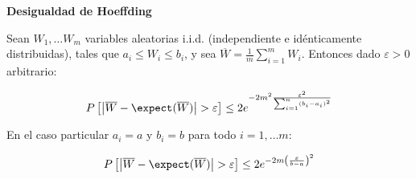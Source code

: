 \begin{lemma} \textbf{Desigualdad de Hoeffding}

 Sean $W_1, \ldots W_m$ variables aleatorias i.i.d. (independiente e idénticamente distribuidas), tales que 
 $a_i \le W_i \le b_i$, y sea $\overline{W} = \frac{1}{m} \sum_{i=1}^m W_i$. Entonces dado $\varepsilon > 0$ arbitrario:

 \[P\left[\left| \overline{W} - \expect(\overline{W}) \right| > \varepsilon \right] \le 2e^{-2m^2 \frac{\varepsilon^2}{\sum_{i=1}^n (b_i-a_i)^2}}\]
 
 En el caso particular $a_i = a$ y $b_i = b$ para todo $i=1, \ldots m$:
 
 \[P\left[\left| \overline{W} - \expect(\overline{W}) \right| > \varepsilon \right] \le 2e^{-2m \left(\frac{\varepsilon}{b-a}\right)^2}\]
 
 
 \label{ineq:hoeffding}
\end{lemma}

